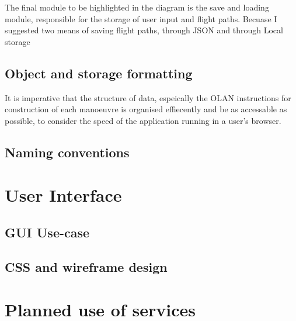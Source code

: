 The final module to be highlighted in the diagram is the save and loading module, responsible for the storage of user input and flight paths. Becuase I suggested two means of saving flight paths, through JSON and through Local storage %

\subsection{Object and storage formatting}
It is imperative that the structure of data, espeically the OLAN instructions for construction of each manoeuvre is organised effiecently and be as accessable as possible, to consider the speed of the application running in a user's browser. 

\subsection{Naming conventions}


\section{User Interface}

\subsection{GUI Use-case}

\subsection{CSS and wireframe design}

\section{Planned use of services}

